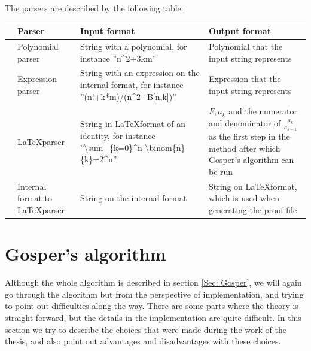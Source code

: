 The parsers are described by the following table:
\begin{center}
  \begin{tabular}{C{1mm}C{3cm}|C{4cm}|C{4cm}}
    &\textbf{Parser}   & \textbf{Input format} & \textbf{Output format} \\ \hline
    &Polynomial parser & String with a polynomial, for instance ''n\^{}2+3km'' & Polynomial that the input string represents \\ \hline
    &Expression parser & String with an expression on the internal format, for instance ''(n!+k*m)/(n\^{}2+B[n,k])'' & Expression that the input string represents \\ \hline
    &\LaTeX parser     & String in \LaTeX format of an identity, for instance ''\textbackslash sum\_\{k=0\}\^{}n \textbackslash binom\{n\}\{k\}=2\^{}n'' & $F, a_k$ and the numerator and denominator of $\frac{a_k}{a_{k-1}}$ as the first step in the method after which Gosper's algorithm can be run \\ \hline
    &Internal format to \LaTeX parser  & String on the internal format & String on \LaTeX format, which is used when generating the proof file \\
  \end{tabular}
\end{center}

\section{Gosper's algorithm}
Although the whole algorithm is described in section \ref{Sec: Gosper}, we will again go through the algorithm but from the perspective of implementation, and trying to point out difficulties along the way. There are some parts where the theory is straight forward, but the details in the implementation are quite difficult. In this section we try to describe the choices that were made during the work of the thesis, and also point out advantages and disadvantages with these choices.
